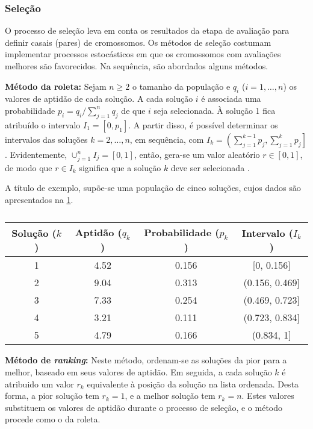\subsubsection{Seleção}

O processo de seleção leva em conta os resultados da etapa de avaliação para definir casais (pares) de cromossomos. Os métodos de seleção costumam implementar processos estocásticos em que os cromossomos com avaliações melhores são favorecidos. Na sequência, são abordados alguns métodos.

\textbf{Método da roleta:} Sejam $n \geq 2$ o tamanho da população e $q_i$ ($i = 1, \dots, n$) os valores de aptidão de cada solução. A cada solução $i$ é associada uma probabilidade $p_i = q_i / \sum_{j=1}^{n}q_j$ de que $i$ seja selecionada. À solução 1 fica atribuído o intervalo $I_1 = [0, p_1]$. A partir disso, é possível determinar os intervalos das soluções $k = 2, \dots, n$, em sequência, com $I_k = \left(\sum_{j=1}^{k-1}p_j, \sum_{j=1}^{k}p_j\right]$. Evidentemente, $\cup_{j=1}^{n}I_j = [0, 1]$, então, gera-se um valor aleatório $r \in [0, 1]$, de modo que $r \in I_k$ significa que a solução $k$ deve ser selecionada \cite{CARVALHO,SASTRY2005}.

A título de exemplo, supõe-se uma população de cinco soluções, cujos dados são apresentados na \cref{tab:roleta}.

\begin{table}[ht]
    \centering
    \caption{}
    \label{tab:roleta}
    \begin{tabular}{cccc}
        \toprule
        Solução ($k$) & Aptidão ($q_k$) & Probabilidade ($p_k$) & Intervalo ($I_k$)\\
        \midrule
        1 & 4.52 & 0.156 & [0, 0.156]\\
        2 & 9.04 & 0.313 & (0.156, 0.469]\\
        3 & 7.33 & 0.254 & (0.469, 0.723]\\
        4 & 3.21 & 0.111 & (0.723, 0.834]\\
        5 & 4.79 & 0.166 & (0.834, 1]\\
        \bottomrule 
    \end{tabular}
\end{table}

\textbf{Método de \emph{ranking}:} Neste método, ordenam-se as soluções da pior para a melhor, baseado em seus valores de aptidão. Em seguida, a cada solução $k$ é atribuido um valor $r_k$ equivalente à posição da solução na lista ordenada. Desta forma, a pior solução tem $r_k = 1$, e a melhor solução tem $r_k = n$. Estes valores substituem os valores de aptidão durante o processo de seleção, e o método procede como o da roleta.

